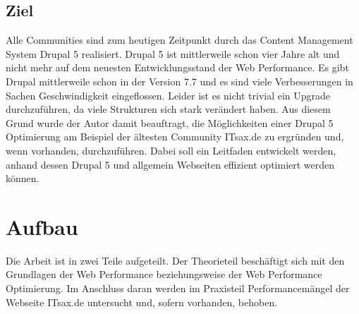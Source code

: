 \subsection{Ziel}
Alle Communities sind zum heutigen Zeitpunkt durch das Content Management System Drupal 5 realisiert. Drupal 5 ist mittlerweile schon vier Jahre alt und nicht mehr auf dem neuesten Entwicklungsstand der Web Performance. Es gibt Drupal mittlerweile schon in der Version 7.7 und es sind viele Verbesserungen in Sachen Geschwindigkeit eingeflossen. Leider ist es nicht trivial ein Upgrade durchzuführen, da viele Strukturen sich stark verändert haben. Aus diesem Grund wurde der Autor damit beauftragt, die Möglichkeiten einer Drupal 5 Optimierung am Beispiel der ältesten Community ITsax.de zu ergründen und, wenn vorhanden, durchzuführen. Dabei soll ein Leitfaden entwickelt werden, anhand dessen Drupal 5 und allgemein Webseiten effizient optimiert werden können.

\section{Aufbau}
Die Arbeit ist in zwei Teile aufgeteilt. Der Theorieteil beschäftigt sich mit den Grundlagen der Web Performance beziehungsweise der Web Performance Optimierung. Im Anschluss daran werden im Praxisteil Performancemängel der Webseite ITsax.de untersucht und, sofern vorhanden, behoben. 
